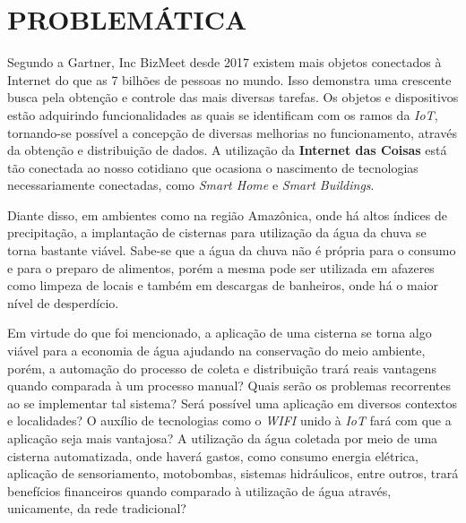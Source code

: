 
\chapter{PROBLEMÁTICA}
\label{chap:problematica}

Segundo a Gartner, Inc BizMeet desde 2017 existem mais objetos conectados à Internet do que as 7 bilhões de pessoas no mundo. Isso demonstra uma crescente busca pela obtenção e controle das mais diversas tarefas. Os objetos e dispositivos estão adquirindo funcionalidades as quais se identificam com os ramos da \textit{IoT}, tornando-se possível a concepção de diversas melhorias no funcionamento, através da obtenção e distribuição de dados.  A utilização da \textbf{Internet das Coisas} está tão conectada ao nosso cotidiano que ocasiona o nascimento de tecnologias necessariamente conectadas, como \textit{Smart Home} e \textit{Smart Buildings}. 

Diante disso, em ambientes como na região Amazônica, onde há altos índices de precipitação, a implantação de cisternas para utilização da água da chuva se torna bastante viável. Sabe-se que a água da chuva não é própria para o consumo e para o preparo de alimentos, porém a mesma pode ser utilizada em afazeres como limpeza de locais e também em descargas de banheiros, onde há o maior nível de desperdício.

Em virtude do que foi mencionado,  a aplicação de uma cisterna se torna algo viável para a economia de água ajudando na conservação do meio ambiente, porém, a automação do processo de coleta e distribuição trará reais vantagens quando comparada à um processo manual? Quais serão os problemas recorrentes ao se implementar tal sistema?  Será possível uma aplicação em diversos contextos e localidades?  O auxílio de tecnologias como o \textit{WIFI} unido à \textit{IoT} fará com que a aplicação seja mais vantajosa?  A utilização da água coletada por meio de uma cisterna automatizada, onde haverá gastos, como consumo energia elétrica, aplicação de sensoriamento, motobombas, sistemas hidráulicos, entre outros, trará benefícios financeiros quando comparado à utilização de água através, unicamente, da rede tradicional?
